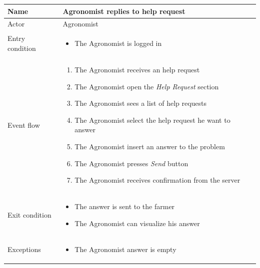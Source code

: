 \begin{table}[H]
    \begin{tabu} to \textwidth {|X|X[4]|}
        \hline
        Name            & Agronomist replies to help request \\ \hline
        Actor           & Agronomist                     \\ \hline
        Entry condition & \begin{itemize}
            \item The Agronomist is logged in
        \end{itemize} \\ \hline
        Event flow      & \begin{enumerate}
            \item The Agronomist receives an help request
            \item The Agronomist open the \emph{Help Request} section
            \item The Agronomist sees a list of help requests
            \item The Agronomist select the help request he want to answer
            \item The Agronomist insert an answer to the problem
            \item The Agronomist presses \emph{Send} button
            \item The Agronomist receives confirmation from the server
        \end{enumerate} \\ \hline
        Exit condition  & \begin{itemize}
            \item The answer is sent to the farmer
            \item The Agronomist can visualize his answer
        \end{itemize} \\ \hline
        Exceptions      & \begin{itemize}
            \item The Agronomist answer is empty
        \end{itemize} \\ \hline
    \end{tabu}
\end{table}

